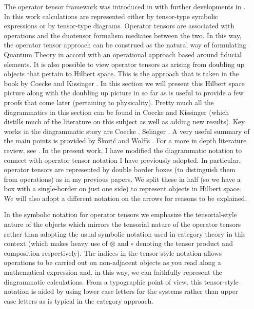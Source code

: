 \documentclass[10pt]{article}
\begin{document}
The operator tensor framework was introduced in \cite{hardy2011reformulating} with further developments in \cite{hardy2012operator, hardy2015quantum, hardy2016operational}.  In this work calculations are represented either by tensor-type symbolic expressions or by tensor-type diagrams.   Operator tensors are associated with operations and the duotensor formalism mediates between the two. In this way, the operator tensor approach can be construed as the natural way of formulating Quantum Theory in accord with an operational approach based around fiducial elements.  It is also possible to view operator tensors as arising from doubling up objects that pertain to Hilbert space.  This is the approach that is taken in the book by Coecke and Kissinger \cite{coecke2017picturing}.  In this section we will present this Hilbert space picture along with the doubling up picture in so far as is useful to provide a few proofs that come later (pertaining to physicality).  Pretty much all the diagrammatics in this section can be found in Coecke and Kissinger \cite{coecke2017picturing} (which distills much of the literature on this subject as well as adding new results). Key works in the diagrammatic story are Coecke \cite{quant-ph/0402014, coecke2007linearizing}, Selinger \cite{selinger2007dagger}.  A very useful summary of the main points is provided by \v Skori\'c and Wolffs \cite{skoric2021diagrammatic}.  For a more in depth literature review, see \cite{skoric2021diagrammatic}.  In the present work, I have modified the diagrammatic notation to connect with operator tensor notation I have previously adopted.  In particular, operator tensors are represented by double border boxes (to distinguish them from operations) as in my previous papers.  We split these in half (so we have a box with a single-border on just one side) to represent objects in Hilbert space.  We will also adopt a different notation on the arrows for reasons to be explained.

In the symbolic notation for operator tensors we emphasize the tensorial-style nature of the objects which mirrors the tensorial nature of the operator tensors rather than adopting the usual symbolic notation used in category theory in this context (which makes heavy use of $\otimes$ and $\circ$ denoting the tensor product and composition respectively).  The indices in the tensor-style notation allows operations to be carried out on non-adjacent objects as you read along a mathematical expression and, in this way, we can faithfully represent the diagrammatic calculations.  From a typographic point of view, this tensor-style notation is aided by using lower case letters for the systems rather than upper case letters as is typical in the category approach.
\end{document}
